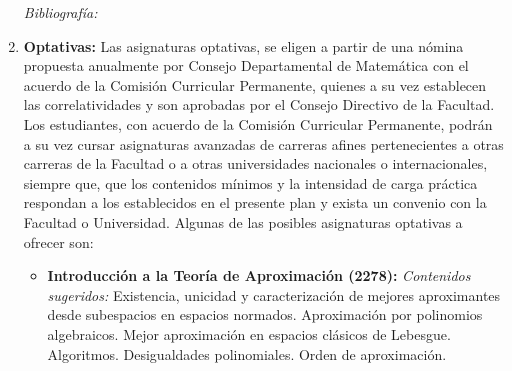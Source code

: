 \documentclass[a4paper, 12pt]{article}
\begin{document}
\begin{enumerate}



\emph{Bibliografía:} \cite{buell2021mathematics,karaali2021mathematics,karaali2019mathematics,doi:10.1080/10511970.2018.1530707,doi:10.1080/10511970.2018.1512538,doi:10.1080/10511970.2018.1456498,doi:10.1080/10511970.2018.1530706,doi:10.1080/10511970.2018.1456497,doi:10.1080/10511970.2018.1472683,FredRoberts1395,JuanCarlosCortes1396,DonaldG.Saari1397,LeeRudolph1398,UrszulaStrawinska-Zanko1399,HuijiongWang1400,AhmadK.Naimzada1401,ClaudioCioffi-Revilla1402}

 



\item\textbf{Optativas:} 
Las asignaturas optativas, se eligen a partir de una nómina propuesta anualmente por Consejo Departamental de Matemática con el acuerdo de la Comisión Curricular Permanente, quienes a su vez establecen las correlatividades y son aprobadas por el Consejo Directivo de la Facultad. Los estudiantes, con acuerdo de la Comisión Curricular
Permanente, podrán a su vez cursar asignaturas avanzadas de carreras afines pertenecientes a otras carreras de la Facultad o a otras universidades nacionales o internacionales, siempre que, que los contenidos mínimos y la intensidad de carga
práctica respondan a los establecidos en el presente plan y exista un convenio con la Facultad o Universidad.
Algunas de las posibles asignaturas optativas a ofrecer son:




\begin{itemize}


\item\textbf{Introducción a la Teoría de Aproximación (2278):}
\emph{Contenidos sugeridos:}
Existencia, unicidad y caracterización de mejores aproximantes desde subespacios en espacios normados. Aproximación por polinomios algebraicos.  Mejor aproximación en espacios clásicos de Lebesgue. Algoritmos. Desigualdades polinomiales. Orden de aproximación. 


\end{itemize}
\end{enumerate}
\end{document}
